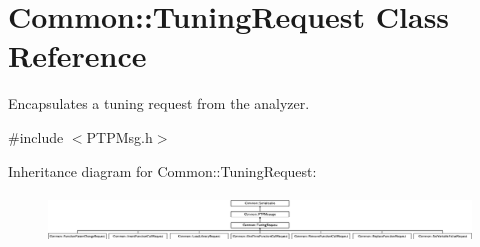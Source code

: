 \hypertarget{class_common_1_1_tuning_request}{\section{Common\-:\-:Tuning\-Request Class Reference}
\label{class_common_1_1_tuning_request}
}


Encapsulates a tuning request from the analyzer.  




{\ttfamily \#include $<$P\-T\-P\-Msg.\-h$>$}

Inheritance diagram for Common\-:\-:Tuning\-Request\-:\begin{figure}[H]
\begin{center}
\leavevmode
\includegraphics[height=1.295547cm]{class_common_1_1_tuning_request}
\end{center}
\end{figure}
